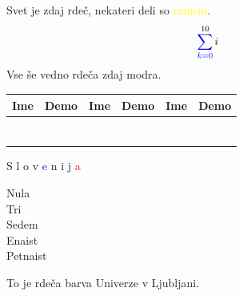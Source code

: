 \documentclass{article}
\begin{document}
\color{red} Svet je zdaj rdeč, nekateri deli so \textcolor{yellow}{rumeni}. 
\[\mathcolor{blue}{\sum_{k=0}}^{10} i \]
Vse še vedno rdeča
\color{blue}
zdaj modra.


\begin{table}
  
  \begin{tabular}{@{}lc*2{@{\qquad}lc}@{}}
    \toprule
    Ime                 & Demo                  &
    Ime                 & Demo                  &
    Ime                 & Demo                                       \\
    \midrule
        &  &  \\
         &       &     \\
        &    &    \\
         &      &  \\
     &     &   \\
         &       &  \\
        &                       &                    \\
    \bottomrule
  \end{tabular}
\end{table}

\vspace{2cm}

\textcolor{white!80!blue}{S}
\textcolor{white!60!blue}{l}
\textcolor{white!40!blue}{o}
\textcolor{white!20!blue}{v}
\textcolor{blue}{e}
\textcolor{blue!75!red}{n}
\textcolor{blue!50!red}{i}
\textcolor{blue!25!red}{j}
\textcolor{red}{a}


\vspace{2cm}
\noindent
\textcolor[Gray]{0}{Nula} \\
\textcolor[Gray]{3}{Tri} \\
\textcolor[Gray]{7}{Sedem} \\
\textcolor[Gray]{11}{Enaist} \\
\textcolor[Gray]{15}{Petnaist}

\vspace{2cm}


\noindent
\textcolor{ULrdeca}
{To je rdeča barva Univerze v Ljubljani.}
\end{document}
